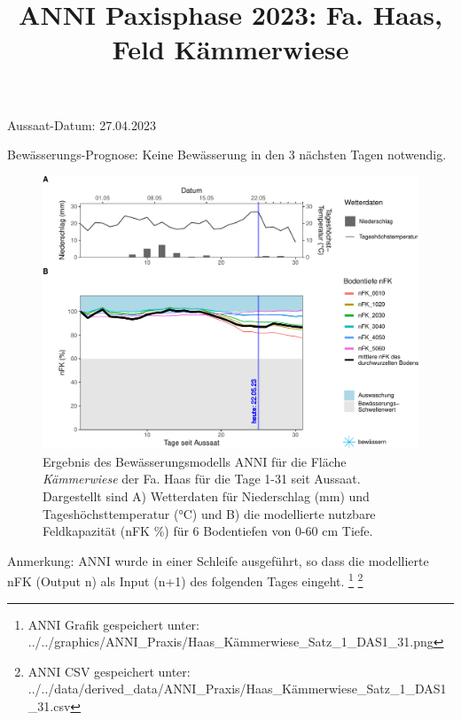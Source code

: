 \documentclass[
]{article}
\title{ANNI Paxisphase 2023: Fa. Haas, Feld Kämmerwiese}
\author{}
\date{\vspace{-2.5em}}
\begin{document}
\maketitle

Aussaat-Datum: 27.04.2023

Bewässerungs-Prognose: Keine Bewässerung in den 3 nächsten Tagen
notwendig.

\hfill\break

\begin{figure}[H]
\includegraphics{ANNI_anwenden_Praxis_files/figure-latex/unnamed-chunk-19-1} \caption{Ergebnis des Bewässerungsmodells ANNI für die Fläche \textit{Kämmerwiese} der Fa. Haas für die Tage 1-31 seit Aussaat. Dargestellt sind A) Wetterdaten für Niederschlag (mm) und Tageshöchsttemperatur (°C) und B) die modellierte nutzbare Feldkapazität (nFK \%) für 6 Bodentiefen von 0-60 cm Tiefe.}\label{fig:unnamed-chunk-19}
\end{figure}

Anmerkung: ANNI wurde in einer Schleife ausgeführt, so dass die
modellierte nFK (Output n) als Input (n+1) des folgenden Tages eingeht.
\footnote{ANNI Grafik gespeichert unter:
  ../../graphics/ANNI\_Praxis/Haas\_Kämmerwiese\_Satz\_1\_DAS1\_31.png}
\footnote{ANNI CSV gespeichert unter:
  ../../data/derived\_data/ANNI\_Praxis/Haas\_Kämmerwiese\_Satz\_1\_DAS1\_31.csv}
\end{document}
